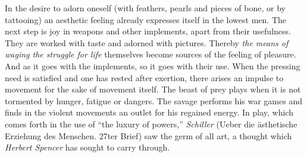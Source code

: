 \documentclass[12pt,a4paper]{book}
\newcommand{\opage}[1]{\marginnote{\footnotesize\textit{[#1]}}}
\begin{document}
In the desire to adorn oneself (with feathers, pearls and pieces of bone,
or by tattooing) an aesthetic feeling already expresses itself in the
lowest men. The next step is joy in weapons and other implements, apart
from their usefulness. They are worked with taste and adorned with
pictures. Thereby \emph{the means of} \emph{waging the struggle for
life} themselves become sources of the feeling of pleasure. And as it
goes with the implements, so it goes with their use. When the pressing
need is satisfied and one has rested after exertion,
\opage{316}there arises an impulse to movement for the sake of movement
itself. The beast of prey plays when it is not tormented by hunger,
fatigue or dangers. The savage performs his war games and finds in the
violent movements an outlet for his regained energy. In play, which
comes forth in the use of ``the luxury of powers,'' \emph{Schiller}
(Ueber die ästhetische Erziehung des Menschen. 27ter Brief) saw the germ
of all art, a thought which \emph{Herbert Spencer} has sought to carry
through.
\end{document}
